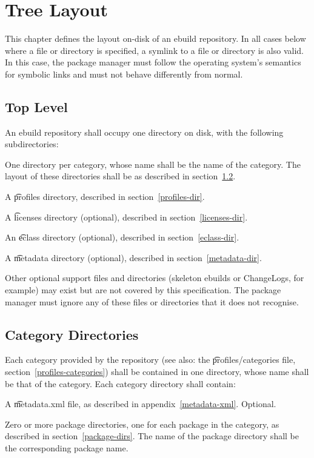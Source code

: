 \chapter{Tree Layout}

This chapter defines the layout on-disk of an ebuild repository. In all cases below where a file or
directory is specified, a symlink to a file or directory is also valid. In this case, the package
manager must follow the operating system's semantics for symbolic links and must not behave
differently from normal.

\section{Top Level}

An ebuild repository shall occupy one directory on disk, with the following subdirectories:
\begin{compactitem}
\item One directory per category, whose name shall be the name of the category. The layout of
    these directories shall be as described in section~\ref{category-dirs}.
\item A \t{profiles} directory, described in section~\ref{profiles-dir}.
\item A \t{licenses} directory (optional), described in section~\ref{licenses-dir}.
\item An \t{eclass} directory (optional), described in section~\ref{eclass-dir}.
\item A \t{metadata} directory (optional), described in section~\ref{metadata-dir}.
\item Other optional support files and directories (skeleton ebuilds or ChangeLogs,
    for example) may exist but are not covered by this specification. The package manager must
    ignore any of these files or directories that it does not recognise.

\end{compactitem}

\section{Category Directories}
\label{category-dirs}

Each category provided by the repository (see also: the
\t{profiles/categories} file, section~\ref{profiles-categories}) shall
be contained in one directory, whose name shall be that of the
category. Each category directory shall contain:
\begin{compactitem}
\item A \t{metadata.xml} file, as described in appendix~\ref{metadata-xml}\@. Optional.
\item Zero or more package directories, one for each package in the
  category, as described in section~\ref{package-dirs}. The name of
  the package directory shall be the corresponding package name.
\end{compactitem}


